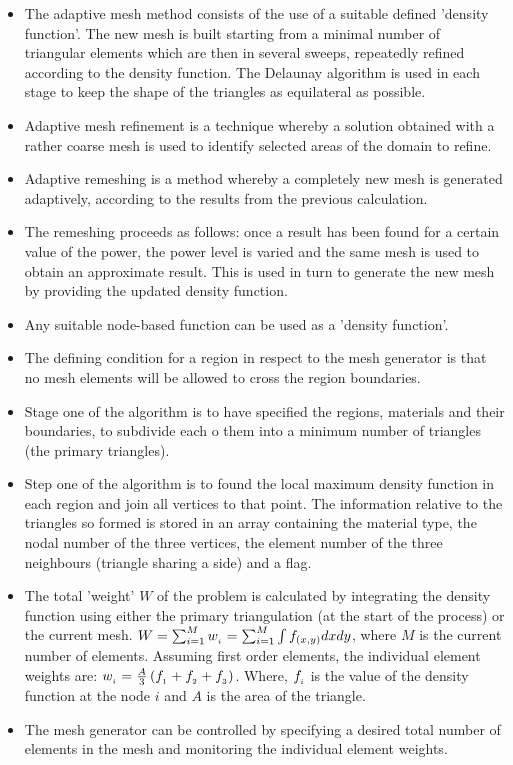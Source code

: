         \begin{itemize}
            \item The adaptive mesh method consists of the use of a suitable defined 'density function'. The new mesh is built starting from a minimal number of triangular elements which are then in several sweeps, repeatedly refined according to the density function. The Delaunay algorithm is used in each stage to keep the shape of the triangles as equilateral as possible.
            \item Adaptive mesh refinement is a technique whereby a solution obtained with a rather coarse mesh is used to identify selected areas of the domain to refine. 
            \item Adaptive remeshing is a method whereby a completely new mesh is generated adaptively, according to the results from the previous calculation.  
            \item The remeshing proceeds as follows: once a result has been found for a certain value of the power, the power level is varied and the same mesh is used to obtain an approximate result. This is used in turn to generate the new mesh by providing the updated density function. 
            \item Any suitable node-based function can be used as a 'density function'. 
            \item The defining condition for a region in respect to the mesh generator is that no mesh elements will be allowed to cross the region boundaries. 
            \item Stage one of the algorithm is to have specified the regions, materials and their boundaries, to subdivide each o them into a minimum number of triangles (the primary triangles).
            \item Step one of the algorithm is to found the local maximum density function in each region and join all vertices to that point. The information relative to the triangles so formed is stored in an array containing the material type, the nodal number of the three vertices, the element number of the three neighbours (triangle sharing a side) and a flag.  
            \item The total 'weight' $W$ of the problem is calculated by integrating the density function using either the primary triangulation (at the start of the process) or the current mesh. $W = \sum^M_{i=1} w_{_{i}} = \sum^M_{i=1}\int f_{\left(x,y\right)}dxdy $, where $M$ is the current number of elements. Assuming first order elements, the individual element weights are: $w_{_{i}} = \frac{A}{3}\left(f_{_{1}} + f_{_{2}} + f_{_{3}}\right)$. Where, $f_{_{i}}$ is the value of the density function at the node $i$ and $A$ is the area of the triangle. 
            \item The mesh generator can be controlled by specifying a desired total number of elements in the mesh and monitoring the individual element weights. 
        \end{itemize}


